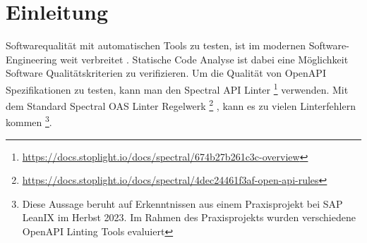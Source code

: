 \section{Einleitung}

Softwarequalität mit automatischen Tools zu testen, ist im modernen Software-Engineering weit verbreitet \parencite{tomasdottir_adoption_2018}. Statische Code Analyse ist dabei eine Möglichkeit Software Qualitätskriterien zu verifizieren. Um die Qualität von OpenAPI Spezifikationen zu testen, kann man den Spectral API Linter
  \footnote{\href{https://docs.stoplight.io/docs/spectral/674b27b261c3c-overview}{https://docs.stoplight.io/docs/spectral/674b27b261c3c-overview}} 
verwenden. Mit dem Standard Spectral OAS Linter Regelwerk 
  \footnote{\href{https://docs.stoplight.io/docs/spectral/4dec24461f3af-open-api-rules}{https://docs.stoplight.io/docs/spectral/4dec24461f3af-open-api-rules}}
, kann es zu vielen Linterfehlern kommen
  \footnote{Diese Aussage beruht auf Erkenntnissen aus einem Praxisprojekt bei SAP LeanIX im Herbst 2023. Im Rahmen des Praxisprojekts wurden verschiedene OpenAPI Linting Tools evaluiert}.